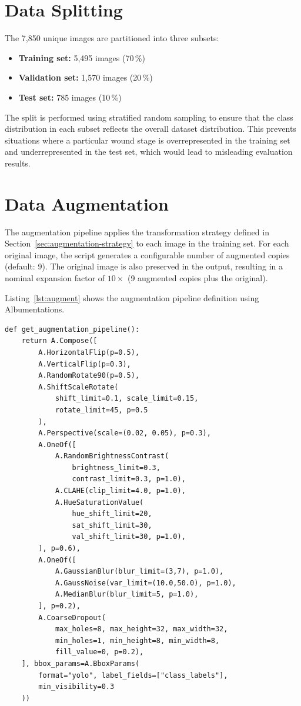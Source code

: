 \documentclass[a4paper,12pt,twoside]{report}
\begin{document}
\section{Data Splitting}
\label{sec:data-splitting}

The 7,850 unique images are partitioned into three subsets:

\begin{itemize}
  \item \textbf{Training set:} 5,495 images (70\,\%)
  \item \textbf{Validation set:} 1,570 images (20\,\%)
  \item \textbf{Test set:} 785 images (10\,\%)
\end{itemize}

The split is performed using stratified random sampling to ensure that the class
distribution in each subset reflects the overall dataset distribution. This
prevents situations where a particular wound stage is overrepresented in the
training set and underrepresented in the test set, which would lead to misleading
evaluation results.

\section{Data Augmentation}
\label{sec:augmentation-impl}

The augmentation pipeline applies the transformation strategy defined in
Section~\ref{sec:augmentation-strategy} to each image in the training set. For
each original image, the script generates a configurable number of augmented
copies (default: 9). The original image is also preserved in the output,
resulting in a nominal expansion factor of $10\times$ (9 augmented copies plus
the original).

Listing~\ref{lst:augment} shows the augmentation pipeline definition using
Albumentations.

\begin{lstlisting}[caption={Augmentation pipeline definition using
  Albumentations.}, label={lst:augment}]
def get_augmentation_pipeline():
    return A.Compose([
        A.HorizontalFlip(p=0.5),
        A.VerticalFlip(p=0.3),
        A.RandomRotate90(p=0.5),
        A.ShiftScaleRotate(
            shift_limit=0.1, scale_limit=0.15,
            rotate_limit=45, p=0.5
        ),
        A.Perspective(scale=(0.02, 0.05), p=0.3),
        A.OneOf([
            A.RandomBrightnessContrast(
                brightness_limit=0.3,
                contrast_limit=0.3, p=1.0),
            A.CLAHE(clip_limit=4.0, p=1.0),
            A.HueSaturationValue(
                hue_shift_limit=20,
                sat_shift_limit=30,
                val_shift_limit=30, p=1.0),
        ], p=0.6),
        A.OneOf([
            A.GaussianBlur(blur_limit=(3,7), p=1.0),
            A.GaussNoise(var_limit=(10.0,50.0), p=1.0),
            A.MedianBlur(blur_limit=5, p=1.0),
        ], p=0.2),
        A.CoarseDropout(
            max_holes=8, max_height=32, max_width=32,
            min_holes=1, min_height=8, min_width=8,
            fill_value=0, p=0.2),
    ], bbox_params=A.BboxParams(
        format="yolo", label_fields=["class_labels"],
        min_visibility=0.3
    ))
\end{lstlisting}
\end{document}
